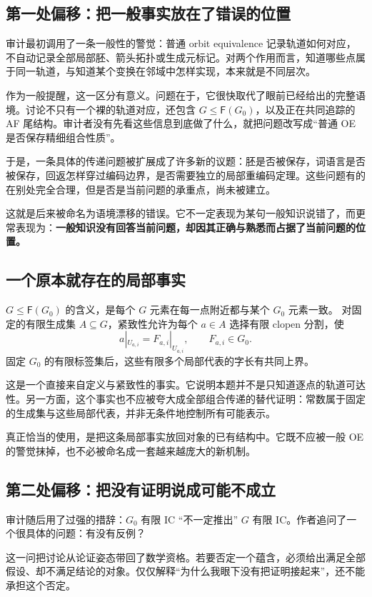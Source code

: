 \documentclass[UTF8,zihao=-4,fontset=none,oneside,openany]{ctexbook}
\newcommand{\FF}{\mathsf F}
\begin{document}
\subsection*{第一处偏移：把一般事实放在了错误的位置}
审计最初调用了一条一般性的警觉：普通 orbit equivalence 记录轨道如何对应，不自动记录全部局部胚、箭头拓扑或生成元标记。对两个作用而言，知道哪些点属于同一轨道，与知道某个变换在邻域中怎样实现，本来就是不同层次。

作为一般提醒，这一区分有意义。问题在于，它很快取代了眼前已经给出的完整语境。讨论不只有一个裸的轨道对应，还包含 $G\leq\FF(G_0)$，以及正在共同追踪的 AF 尾结构。审计者没有先看这些信息到底做了什么，就把问题改写成“普通 OE 是否保存精细组合性质”。

于是，一条具体的传递问题被扩展成了许多新的议题：胚是否被保存，词语言是否被保存，回返怎样穿过编码边界，是否需要独立的局部重编码定理。这些问题有的在别处完全合理，但是否是当前问题的承重点，尚未被建立。

这就是后来被命名为语境漂移的错误。它不一定表现为某句一般知识说错了，而更常表现为：\textbf{一般知识没有回答当前问题，却因其正确与熟悉而占据了当前问题的位置。}

\subsection*{一个原本就存在的局部事实}
$G\leq\FF(G_0)$ 的含义，是每个 $G$ 元素在每一点附近都与某个 $G_0$ 元素一致。\cite[Section~4, p.~14]{kua25} 对固定的有限生成集 $A\subseteq G$，紧致性允许为每个 $a\in A$ 选择有限 clopen 分割，使
\[
  a|_{U_{a,i}}=F_{a,i}|_{U_{a,i}},\qquad F_{a,i}\in G_0.
\]
固定 $G_0$ 的有限标签集后，这些有限多个局部代表的字长有共同上界。

这是一个直接来自定义与紧致性的事实。它说明本题并不是只知道逐点的轨道可达性。另一方面，这个事实也不应被夸大成全部组合传递的替代证明：常数属于固定的生成集与这些局部代表，并非无条件地控制所有可能表示。

真正恰当的使用，是把这条局部事实放回对象的已有结构中。它既不应被一般 OE 的警觉抹掉，也不必被命名成一套越来越庞大的新机制。

\subsection*{第二处偏移：把没有证明说成可能不成立}
审计随后用了过强的措辞：$G_0$ 有限 IC “不一定推出” $G$ 有限 IC。作者追问了一个很具体的问题：有没有反例？

这一问把讨论从论证姿态带回了数学资格。若要否定一个蕴含，必须给出满足全部假设、却不满足结论的对象。仅仅解释“为什么我眼下没有把证明接起来”，还不能承担这个否定。
\end{document}
